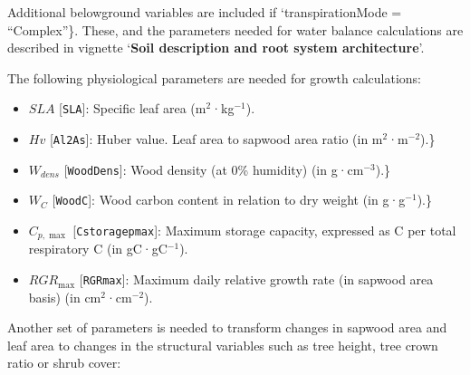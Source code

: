\documentclass[]{book}
\providecommand{\tightlist}{%
  \setlength{\itemsep}{0pt}\setlength{\parskip}{0pt}}
\begin{document}
Additional belowground variables are included if `transpirationMode = ``Complex''\}. These, and the parameters needed for water balance calculations are described in vignette `\textbf{Soil description and root system architecture}'.

The following physiological parameters are needed for growth calculations:

\begin{itemize}
\tightlist
\item
  \(SLA\) {[}\texttt{SLA}{]}: Specific leaf area (m\(^2\)·kg\(^{-1}\)).
\item
  \(Hv\) {[}\texttt{Al2As}{]}: Huber value. Leaf area to sapwood area ratio (in m\(^2\)·m\(^{-2}\)).\}
\item
  \(W_{dens}\) {[}\texttt{WoodDens}{]}: Wood density (at 0\% humidity) (in g·cm\(^{-3}\)).\}
\item
  \(W_{C}\) {[}\texttt{WoodC}{]}: Wood carbon content in relation to dry weight (in g·g\(^{-1}\)).\}
\item
  \(C_{p,\max}\) {[}\texttt{Cstoragepmax}{]}: Maximum storage capacity, expressed as C per total respiratory C (in gC·gC\(^{-1}\)).
\item
  \(RGR_{\max}\) {[}\texttt{RGRmax}{]}: Maximum daily relative growth rate (in sapwood area basis) (in cm\(^2\)·cm\(^{-2}\)).
\end{itemize}

Another set of parameters is needed to transform changes in sapwood area and leaf area to changes in the structural variables such as tree height, tree crown ratio or shrub cover:
\end{document}
